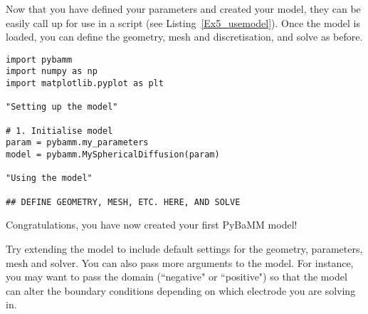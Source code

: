 \documentclass[a4paper,11pt]{article}
\begin{document}
Now that you have defined your parameters and created your model, they can be easily call up for use in a script (see Listing~\ref{Ex5_usemodel}). Once the model is loaded, you can define the geometry, mesh and discretisation, and solve as before.

\begin{lstlisting}[label={Ex5_usemodel},caption=Using your model.]
import pybamm
import numpy as np
import matplotlib.pyplot as plt

"Setting up the model"

# 1. Initialise model
param = pybamm.my_parameters
model = pybamm.MySphericalDiffusion(param)

"Using the model"

## DEFINE GEOMETRY, MESH, ETC. HERE, AND SOLVE
\end{lstlisting}

Congratulations, you have now created your first PyBaMM model!

Try extending the model to include default settings for the geometry, parameters, mesh and solver. You can also pass more arguments to the model. For instance, you may want to pass the domain (``negative" or ``positive") so that the model can alter the boundary conditions depending on which electrode you are solving in.
\end{document}
